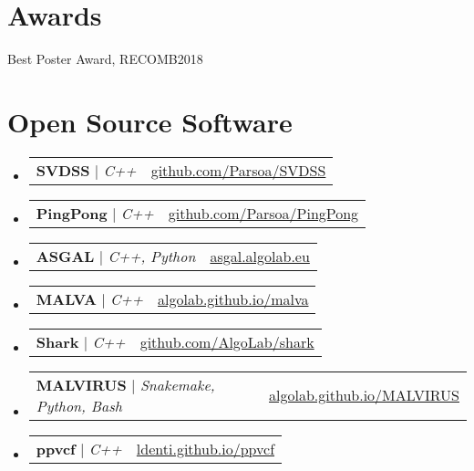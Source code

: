 \documentclass[letterpaper,11pt]{article}
\makeatletter
\newcommand{\resumeProjectHeading}[2]{
    \item
    \begin{tabular*}{0.97\textwidth}{l@{\extracolsep{\fill}}r}
      \small#1 & #2 \\
    \end{tabular*}\vspace{-7pt}
}
\newcommand{\resumeSubHeadingListStart}{\begin{itemize}[leftmargin=0.15in, label={}]}
\newcommand{\resumeSubHeadingListEnd}{\end{itemize}}
\makeatother
\begin{document}
\section{Awards}
 \begin{itemize}
    \small{
        \item Best Poster Award, RECOMB2018
    }
 \end{itemize}
 
\section{Open Source Software}
    \resumeSubHeadingListStart
      \resumeProjectHeading {\textbf{SVDSS} $|$ \emph{C++}}{\href{https://github.com/Parsoa/SVDSS}{github.com/Parsoa/SVDSS}}
      \resumeProjectHeading {\textbf{PingPong} $|$ \emph{C++}}{\href{https://github.com/Parsoa/PingPong}{github.com/Parsoa/PingPong}}
      \resumeProjectHeading {\textbf{ASGAL} $|$ \emph{C++, Python}}{\href{https://asgal.algolab.eu/}{asgal.algolab.eu}}
      \resumeProjectHeading {\textbf{MALVA} $|$ \emph{C++}}{\href{https://algolab.github.io/malva/}{algolab.github.io/malva}}
      \resumeProjectHeading {\textbf{Shark} $|$ \emph{C++}}{\href{https://github.com/AlgoLab/shark}{github.com/AlgoLab/shark}}
      \resumeProjectHeading {\textbf{MALVIRUS} $|$ \emph{Snakemake, Python, Bash}}{\href{https://algolab.github.io/MALVIRUS/}{algolab.github.io/MALVIRUS}}
      \resumeProjectHeading {\textbf{ppvcf} $|$ \emph{C++}}{\href{https://ldenti.github.io/ppvcf/}{ldenti.github.io/ppvcf}}
    \resumeSubHeadingListEnd
\end{document}
